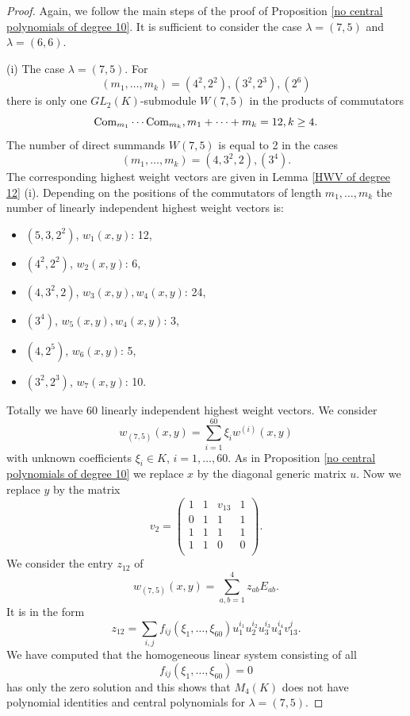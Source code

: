 \documentclass[10pt,a4paper]{amsart}
\begin{document}
\begin{proof}
Again, we follow the main steps of the proof of Proposition \ref{no central polynomials of degree 10}.
It is sufficient to consider the case $\lambda=(7,5)$ and $\lambda=(6,6)$.

(i) The case $\lambda=(7,5)$. For
\[
(m_1,\ldots,m_k)=(4^2,2^2),(3^2,2^3),(2^6)
\]
there is only one $GL_2(K)$-submodule $W(7,5)$ in the products of commutators
\[
\text{\rm Com}_{m_1}\cdots\text{\rm Com}_{m_k},m_1+\cdots+m_k=12,k\geq 4.
\]
The number of direct summands $W(7,5)$ is equal to 2 in the cases
\[
(m_1,\ldots,m_k)=(4,3^2,2),(3^4).
\]
The corresponding highest weight vectors are given in Lemma \ref{HWV of degree 12} (i).
Depending on the positions of the commutators of length $m_1,\ldots,m_k$ the number of linearly independent highest weight vectors is:
\begin{itemize}
\item $(5,3,2^2)$, $w_1(x,y)$: 12,
\item $(4^2,2^2)$, $w_2(x,y)$: 6,
\item $(4,3^2,2)$, $w_3(x,y),w_4(x,y)$: 24,
\item $(3^4)$, $w_5(x,y),w_4(x,y)$: 3,
\item $(4,2^5)$, $w_6(x,y)$: 5,
\item $(3^2,2^3)$, $w_7(x,y)$: 10.
\end{itemize}
Totally we have 60 linearly independent highest weight vectors.
We consider
\[
w_{(7,5)}(x,y)=\sum_{i=1}^{60}\xi_iw^{(i)}(x,y)
\]
with unknown coefficients $\xi_i\in K$, $i=1,\ldots,60$. As in Proposition \ref{no central polynomials of degree 10}
we replace $x$ by the diagonal generic matrix $u$. Now we replace $y$ by the matrix
\[
v_2=\left(\begin{matrix}1&1&v_{13}&1\\
0&1&1&1\\
1&1&1&1\\
1&1&0&0\\
\end{matrix}\right).
\]
We consider the entry $z_{12}$ of
\[
w_{(7,5)}(x,y)=\sum_{a,b=1}^4z_{ab}E_{ab}.
\]
It is in the form
\[
z_{12}=\sum_{i,j}f_{ij}(\xi_1,\ldots,\xi_{60})u_1^{i_1}u_2^{i_2}u_3^{i_3}u_4^{i_4}v_{13}^j.
\]
We have computed that the homogeneous linear system consisting of all
\[
f_{ij}(\xi_1,\ldots,\xi_{60})=0
\]
has only the zero solution and this shows that $M_4(K)$ does not have polynomial identities and central polynomials for $\lambda=(7,5)$.


\end{proof}
\end{document}
